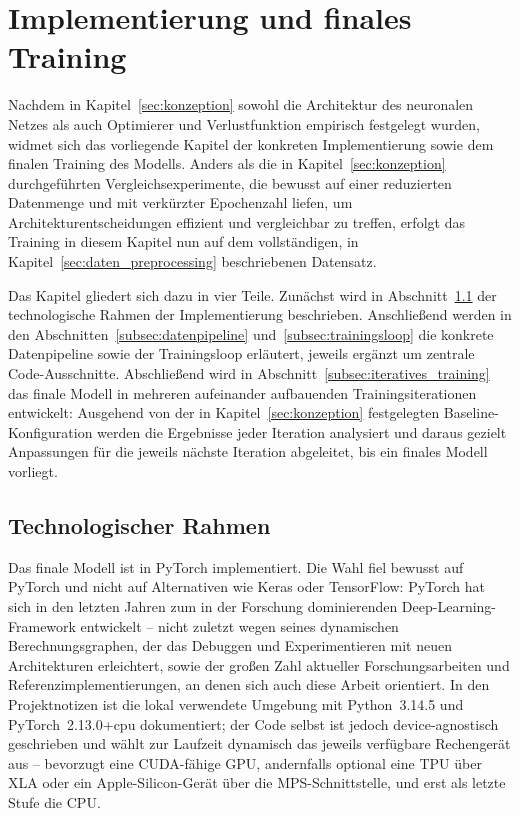 \section{Implementierung und finales Training}
\label{sec:training}

Nachdem in Kapitel~\ref{sec:konzeption} sowohl die Architektur des neuronalen Netzes als auch Optimierer und Verlustfunktion empirisch festgelegt wurden, widmet sich das vorliegende Kapitel der konkreten Implementierung sowie dem finalen Training des Modells. Anders als die in Kapitel~\ref{sec:konzeption} durchgeführten Vergleichsexperimente, die bewusst auf einer reduzierten Datenmenge und mit verkürzter Epochenzahl liefen, um Architekturentscheidungen effizient und vergleichbar zu treffen, erfolgt das Training in diesem Kapitel nun auf dem vollständigen, in Kapitel~\ref{sec:daten_preprocessing} beschriebenen Datensatz.

Das Kapitel gliedert sich dazu in vier Teile. Zunächst wird in Abschnitt~\ref{subsec:technologischer_rahmen} der technologische Rahmen der Implementierung beschrieben. Anschließend werden in den Abschnitten~\ref{subsec:datenpipeline} und~\ref{subsec:trainingsloop} die konkrete Datenpipeline sowie der Trainingsloop erläutert, jeweils ergänzt um zentrale Code-Ausschnitte. Abschließend wird in Abschnitt~\ref{subsec:iteratives_training} das finale Modell in mehreren aufeinander aufbauenden Trainingsiterationen entwickelt: Ausgehend von der in Kapitel~\ref{sec:konzeption} festgelegten Baseline-Konfiguration werden die Ergebnisse jeder Iteration analysiert und daraus gezielt Anpassungen für die jeweils nächste Iteration abgeleitet, bis ein finales Modell vorliegt.

\subsection{Technologischer Rahmen}
\label{subsec:technologischer_rahmen}

Das finale Modell ist in PyTorch implementiert. Die Wahl fiel bewusst auf PyTorch und nicht auf Alternativen wie Keras oder TensorFlow: PyTorch hat sich in den letzten Jahren zum in der Forschung dominierenden Deep-Learning-Framework entwickelt -- nicht zuletzt wegen seines dynamischen Berechnungsgraphen, der das Debuggen und Experimentieren mit neuen Architekturen erleichtert, sowie der großen Zahl aktueller Forschungsarbeiten und Referenzimplementierungen, an denen sich auch diese Arbeit orientiert. In den Projektnotizen ist die lokal verwendete Umgebung mit Python~3.14.5 und PyTorch~2.13.0+cpu dokumentiert; der Code selbst ist jedoch device-agnostisch geschrieben und wählt zur Laufzeit dynamisch das jeweils verfügbare Rechengerät aus -- bevorzugt eine CUDA-fähige \gls{GPU}, andernfalls optional eine \gls{TPU} über XLA oder ein Apple-Silicon-Gerät über die MPS-Schnittstelle, und erst als letzte Stufe die \gls{CPU}.

